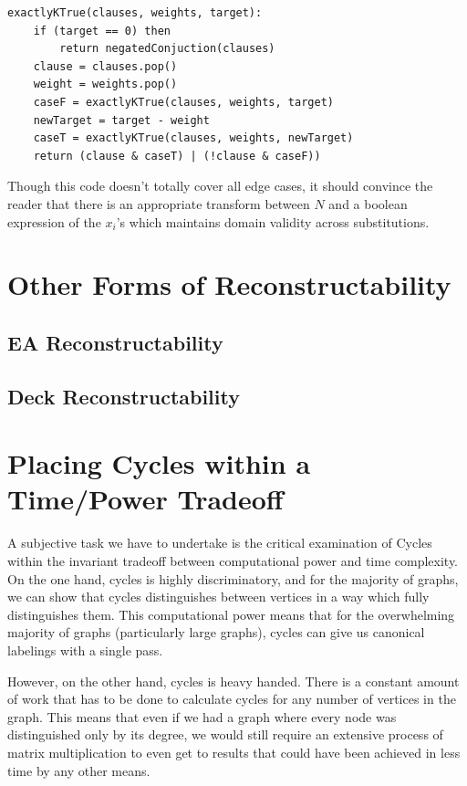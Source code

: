 \documentclass[11pt,a4paper]{report}
\begin{document}
\begin{lstlisting}[frame=single]
exactlyKTrue(clauses, weights, target):
	if (target == 0) then
		return negatedConjuction(clauses)
	clause = clauses.pop()
	weight = weights.pop()
	caseF = exactlyKTrue(clauses, weights, target)
	newTarget = target - weight
	caseT = exactlyKTrue(clauses, weights, newTarget)
	return (clause & caseT) | (!clause & caseF))
\end{lstlisting}

Though this code doesn't totally cover all edge cases, it should convince the reader that there is an appropriate transform between $N$ and a boolean expression of the $x_i$'s which maintains domain validity across substitutions.

\section{Other Forms of Reconstructability}
\subsection{EA Reconstructability}
\subsection{Deck Reconstructability}

\section{Placing Cycles within a Time/Power Tradeoff}
A subjective task we have to undertake is the critical examination of Cycles within the invariant tradeoff between computational power and time complexity.
On the one hand, cycles is highly discriminatory, and for the majority of graphs, we can show that cycles distinguishes between vertices in a way which fully distinguishes them.
This computational power means that for the overwhelming majority of graphs (particularly large graphs), cycles can give us canonical labelings with a single pass.

However, on the other hand, cycles is heavy handed. There is a constant amount of work that has to be done to calculate cycles for any number of vertices in the graph. 
This means that even if we had a graph where every node was distinguished only by its degree, we would still require an extensive process of matrix multiplication to even get to results that could have been achieved in less time by any other means.
\end{document}
